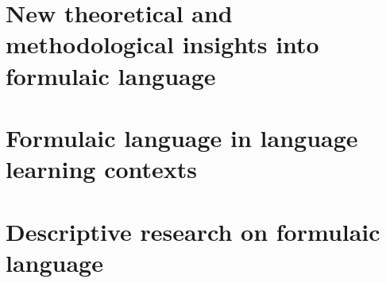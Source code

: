 \documentclass[output=book,
               collection,
               multiauthors,
]{langscibook}
\begin{document}
\maketitle
\frontmatter

{\sloppy\tableofcontents}


% 
% 


\mainmatter


\part{New theoretical and methodological insights into formulaic language}
\part{Formulaic language in language learning contexts}
\part{Descriptive research on formulaic language}


\end{document}
